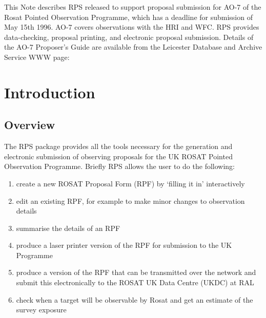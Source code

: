 
This Note describes RPS released to support proposal submission for
AO-7 of the Rosat Pointed Observation Programme, which has a deadline
for submission of May 15th 1996.  AO-7 covers observations with the HRI
and WFC. RPS provides data-checking, proposal printing, and electronic
proposal submission.  Details of the AO-7 Proposer's Guide are
available from the Leicester Database and Archive Service WWW page:

 \newpage
 \begin{latexonly}
   \setlength{\parskip}{0mm}
   \latexonlytoc
   \setlength{\parskip}{\medskipamount}
   \markright{\stardocname}
 \end{latexonly}
\newpage
\renewcommand{\thepage}{\arabic{page}}
\setcounter{page}{1}

\section{\label{se:introduction}Introduction}

\subsection{Overview}

The RPS package provides all the tools necessary for the generation and
electronic submission of observing proposals for the UK ROSAT Pointed
Observation Programme. Briefly RPS allows the user to do the following:

\begin{enumerate}

\item create a new ROSAT Proposal Form (RPF) by `filling it in'
interactively

\item edit an existing RPF, for example to make minor changes to
observation details

\item summarise the details of an RPF

\item produce a laser printer version of the RPF for submission to the
UK Programme

\item produce a version of the RPF that can be transmitted over the
network and submit this electronically to the ROSAT UK Data Centre
(UKDC) at RAL

\item check when a target will be observable by Rosat and get an
estimate of the survey exposure

\end{enumerate}

